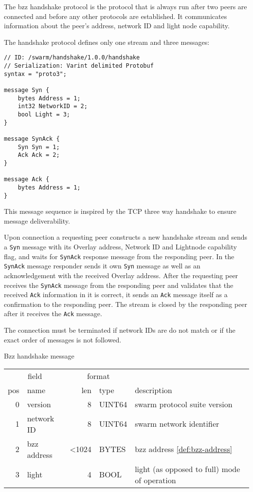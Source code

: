 The bzz handshake protocol is the protocol that is always run after two peers are connected and before any other protocols are established. It communicates information about the  peer's address, network ID and light node capability.

The handshake protocol defines only one stream and three messages:

\begin{lstlisting}[basicstyle=\ttfamily]
// ID: /swarm/handshake/1.0.0/handshake
// Serialization: Varint delimited Protobuf
syntax = "proto3";

message Syn {
    bytes Address = 1;
    int32 NetworkID = 2;
    bool Light = 3;
}

message SynAck {
    Syn Syn = 1;
    Ack Ack = 2;
}

message Ack {
    bytes Address = 1;
}
\end{lstlisting}

This message sequence is inspired by the TCP three way handshake to ensure message deliverability.

Upon connection a requesting peer constructs a new handshake stream and sends a \texttt{Syn} message with its Overlay address, Network ID and Lightnode capability flag, and waits for \texttt{SynAck} response message from the responding peer. In  the  \texttt{SynAck} message responder sends it own \texttt{Syn} message as well as an acknowledgement with the received Overlay address. After the requesting peer receives the \texttt{SynAck} message from the responding peer and validates that the received \texttt{Ack} information in it is correct, it sends an \texttt{Ack} message itself as a confirmation to the responding peer. The stream is closed by the responding peer after it receives the \texttt{Ack} message.

The connection must be terminated if network IDs are do not match or if the  exact  order of messages is not followed.

\begin{definition}{Bzz handshake message}\label{def:bzz-handshake}

\begin{tabular}{r|l|r|l|l}
\multicolumn{2}{c|}{field}& 
\multicolumn{2}{c|}{format}& 
\\
pos & name  & len & type & description \\\hline
0  & version & 8 & UINT64 & swarm protocol suite version\\\hline
1  & network ID & 8 & UINT64 & swarm network identifier\\\hline
2 & bzz address & <1024 & BYTES & bzz address \ref{def:bzz-address}\\\hline
3 & light & 4 & BOOL & light (as opposed to full) mode of operation
\end{tabular}
\end{definition}

